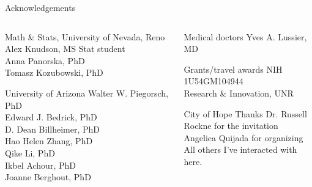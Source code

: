 \documentclass[ignorenonframetext,aspectratio=169,]{beamer}
\begin{document}
\begin{frame}{%
\protect\hypertarget{acknowledgements}{%
Acknowledgements}}

\begin{columns}[T]
  \begin{column}{0.55\columnwidth}
    \begin{block}{Math \& Stats, University of Nevada, Reno}
      Alex Knudson, MS Stat student\\
      Anna Panorska, PhD\\
      Tomasz Kozubowski, PhD
    \end{block}
    \begin{block}{University of Arizona}
      Walter W. Piegorsch, PhD\\
      Edward J. Bedrick, PhD\\
      D. Dean Billheimer, PhD\\
      Hao Helen Zhang, PhD\\
      Qike Li, PhD\\
      Ikbel Achour, PhD\\
      Joanne Berghout, PhD
    \end{block}
  \end{column}

\begin{column}{0.45\columnwidth}
    \begin{block}{Medical doctors}
      Yves A. Lussier, MD
    \end{block}
    \begin{block}{Grants/travel awards}
      NIH 1U54GM104944 \\
      Research \& Innovation, UNR
    \end{block}
    \begin{block}{City of Hope}
      Thanks Dr. Russell Rockne for the invitation\\
      Angelica Quijada for organizing\\
      All others I've interacted with here.
    \end{block}
  \end{column}
\end{columns}

\end{frame}
\end{document}
